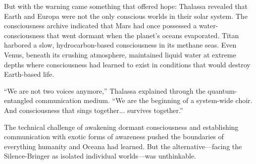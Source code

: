 But with the warning came something that offered hope: Thalassa revealed that Earth and Europa were not the only conscious worlds in their solar system. The consciousness archive indicated that Mars had once possessed a water-consciousness that went dormant when the planet's oceans evaporated. Titan harbored a slow, hydrocarbon-based consciousness in its methane seas. Even Venus, beneath its crushing atmosphere, maintained liquid water at extreme depths where consciousness had learned to exist in conditions that would destroy Earth-based life.

``We are not two voices anymore,'' Thalassa explained through the quantum-entangled communication medium. ``We are the beginning of a system-wide choir. And consciousness that sings together... survives together.''

The technical challenge of awakening dormant consciousness and establishing communication with exotic forms of awareness pushed the boundaries of everything humanity and Oceana had learned. But the alternative—facing the Silence-Bringer as isolated individual worlds—was unthinkable.


